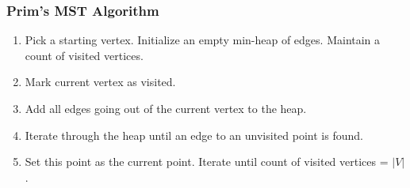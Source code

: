 \documentclass{report}
\begin{document}
\subsubsection*{Prim's MST Algorithm}
\begin{enumerate}
    \item Pick a starting vertex. Initialize an empty min-heap of edges. Maintain a count of visited vertices.
    \item Mark current vertex as visited.
    \item Add all edges going out of the current vertex to the heap.
    \item Iterate through the heap until an edge to an unvisited point is found.
    \item Set this point as the current point. Iterate until count of visited vertices = $|V|$.
\end{enumerate}
\end{document}

